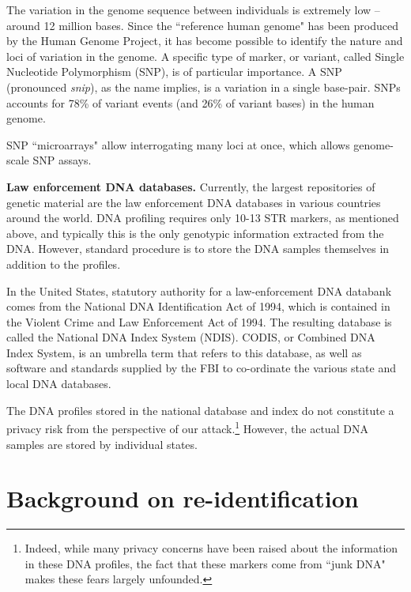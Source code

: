 \documentclass{article}
\begin{document}
The variation in the genome sequence between individuals is extremely low -- around 12 million bases.  Since the ``reference human genome" has been produced by the Human Genome Project, it has become possible to identify the nature and loci of variation in the genome. A specific type of marker, or variant, called Single Nucleotide Polymorphism (SNP), is of particular importance.  A SNP (pronounced {\em snip}), as the name implies, is a variation in a single base-pair.  SNPs accounts for 78\% of variant events (and 26\% of variant bases) in the human genome.  

SNP ``microarrays" allow interrogating many loci at once, which allows genome-scale SNP assays. 




{\bf Law enforcement DNA databases.}
Currently, the largest repositories of genetic material are the law enforcement DNA databases in various countries around the world.  DNA profiling requires only 10-13 STR markers, as mentioned above, and typically this is the only genotypic information extracted from the DNA. However, standard procedure is to store the DNA samples themselves in addition to the profiles.

In the United States, statutory authority for a law-enforcement DNA databank comes from the National DNA Identification Act of 1994, which is contained in the Violent Crime and Law Enforcement Act of 1994. The resulting database is called the National DNA Index System (NDIS). CODIS, or Combined DNA Index System, is an umbrella term that refers to this database, as well as software and standards supplied by the FBI to co-ordinate the various state and local DNA databases.

The DNA profiles stored in the national database and index do not constitute a privacy risk from the perspective of our attack.\footnote{Indeed, while many privacy concerns have been raised about the information in these DNA profiles, the fact that these markers come from ``junk DNA" makes these fears largely unfounded.}  However, the actual DNA samples are stored by individual states. 

\section{Background on re-identification}
\label{reidentification}
\end{document}
